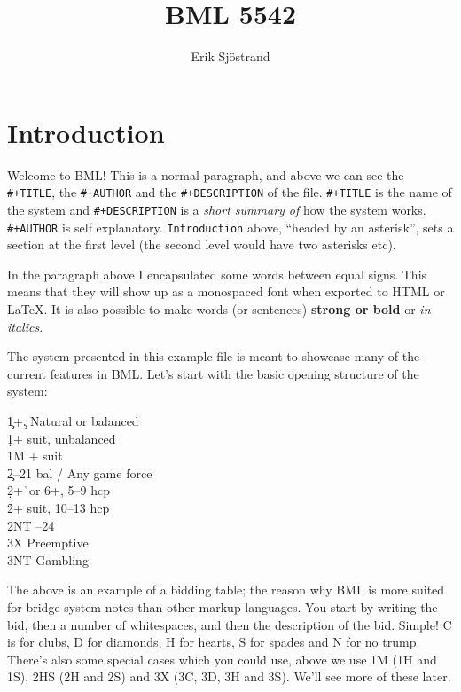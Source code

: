 \documentclass[a4paper]{article}
\title{BML 5542}
\author{Erik Sjöstrand}
\begin{document}
\maketitle
\tableofcontents

\section{Introduction}

Welcome to BML! This is a normal paragraph, and above we can see
the \texttt{\#+TITLE}, the \texttt{\#+AUTHOR} and the \texttt{\#+DESCRIPTION} of the file. \texttt{\#+TITLE} is
the name of the system and \texttt{\#+DESCRIPTION} is a \emph{short summary of} how
the system works. \texttt{\#+AUTHOR} is self explanatory. \texttt{Introduction} above,
``headed by an asterisk'', sets a section at the first level (the second
level would have two asterisks etc).

In the paragraph above I encapsulated some words between equal
signs. This means that they will show up as a monospaced font when
exported to HTML or LaTeX. It is also possible to make words (or
sentences) \textbf{strong or bold} or \emph{in italics}.

The system presented in this example file is meant to showcase many
of the current features in BML. Let's start with the basic opening
structure of the system:

\begin{bidtable}
1\c {}+\c . Natural or balanced\\
1\d {}+ suit, unbalanced\\
1M + suit\\
2\c {}--21 bal / Any game force\\
2\d {}+\h\ or 6+\s , 5--9 hcp\\
2\h\s {}+ suit, 10--13 hcp\\
2NT --24\\
3X \> Preemptive\\
3NT \> Gambling
\end{bidtable}

The above is an example of a bidding table; the reason why BML is
more suited for bridge system notes than other markup languages. You
start by writing the bid, then a number of whitespaces, and then the
description of the bid. Simple! C is for clubs, D for diamonds, H
for hearts, S for spades and N for no trump. There's also some
special cases which you could use, above we use 1M (1H and 1S), 2HS
(2H and 2S) and 3X (3C, 3D, 3H and 3S). We'll see more of these
later.
\end{document}
